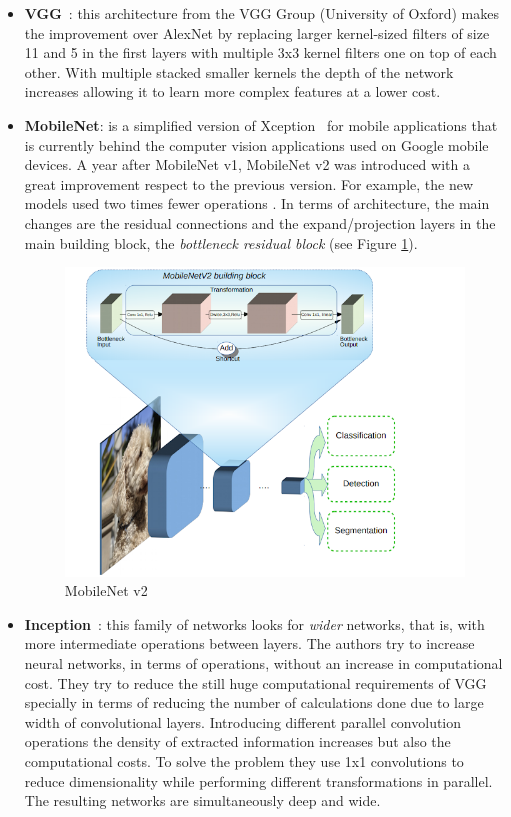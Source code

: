 \begin{itemize}
\item \textbf{VGG}~\cite{simonyan2014very}: this architecture from the VGG Group (University of Oxford) makes the improvement over AlexNet by replacing larger kernel-sized filters of size 11 and 5 in the first layers with multiple 3x3 kernel filters one on top of each other. With multiple stacked smaller kernels the depth of the network increases allowing it to learn more complex features at a lower cost.
\item \textbf{MobileNet}\label{mobilenet}: is a simplified version of Xception~\cite{chollet2016xception} for mobile applications that is currently behind the computer vision applications used on Google mobile devices. A year after MobileNet v1, MobileNet v2 was introduced with a great improvement respect to the previous version. For example, the new models used two times fewer operations \cite{sandler2018mobilenetv2}. In terms of architecture, the main changes are the residual connections and the expand/projection layers in the main building block, the \textit{bottleneck residual block} (see Figure \ref{fig:mobilenet}).
\begin{figure}[H]
\begin{center}
\includegraphics[scale=0.45]{figures/mobilenet_v2.png}
\caption{MobileNet v2 \cite{sandler2018mobilenetv2}}
\label{fig:mobilenet}
\end{center}
\end{figure}
\item \textbf{Inception}~\cite{szegedy2015going}: this family of networks looks for \textit{wider} networks, that is, with more intermediate operations between layers. The authors try to increase neural networks, in terms of operations, without an increase in computational cost. They try to reduce the still huge computational requirements of VGG specially in terms of reducing the number of calculations done due to large width of convolutional layers. Introducing different parallel convolution operations the density of extracted information increases but also the computational costs. To solve the problem they use 1x1 convolutions to reduce dimensionality while performing different transformations in parallel. The resulting networks are simultaneously deep and wide.\\

\end{itemize}
